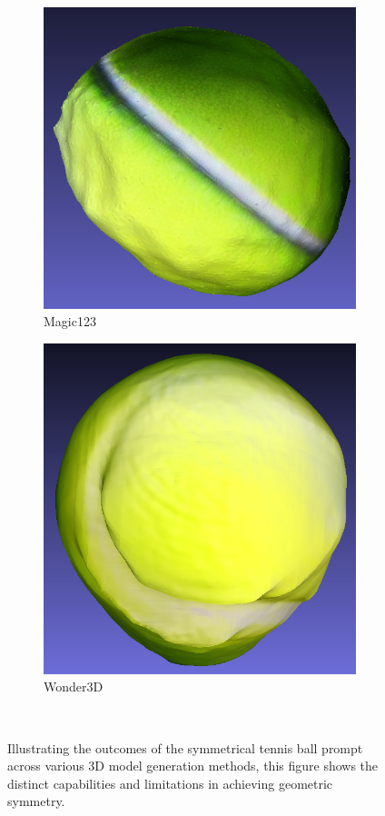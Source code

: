 \begin{figure}[ht]
    \begin{subfigure}[b]{0.22\textwidth}
        \centering
        \includegraphics[width=\textwidth]{etc/a symmetrical tennis ball/magic123/magic123_ball_result.png}
        \caption{Magic123}
    \end{subfigure}
    \begin{subfigure}[b]{0.2\textwidth}
        \centering
        \includegraphics[width=\textwidth]{etc/a symmetrical tennis ball/wonder3D/wonder3d_ball_result.png}
        \caption{Wonder3D}
    \end{subfigure}
    \caption{Illustrating the outcomes of the symmetrical tennis ball prompt across various 3D model generation methods, this figure shows the distinct capabilities and limitations in achieving geometric symmetry.}~\label{fig:Ball}
\end{figure}



